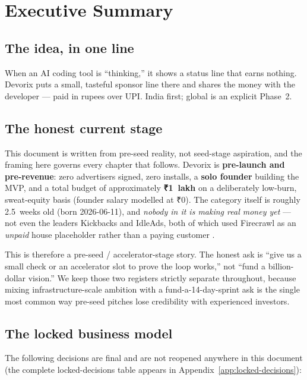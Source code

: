 \chapter{Executive Summary}
\label{ch:executive-summary}

\section{The idea, in one line}

When an AI coding tool is ``thinking,'' it shows a status line that earns
nothing. Devorix puts a small, tasteful sponsor line there and shares the money
with the developer --- paid in rupees over UPI. India first; global is an
explicit Phase~2.

\section{The honest current stage}

This document is written from pre-seed reality, not seed-stage aspiration, and
the framing here governs every chapter that follows. Devorix is
\textbf{pre-launch and pre-revenue}: zero advertisers signed, zero installs, a
\textbf{solo founder} building the MVP, and a total budget of approximately
\textbf{₹1~lakh} on a deliberately low-burn, sweat-equity basis (founder
salary modelled at ₹0). The category itself is roughly 2.5~weeks old (born
2026-06-11), and \emph{nobody in it is making real money yet} --- not even the
leaders Kickbacks and IdleAds, both of which used Firecrawl as an
\emph{unpaid} house placeholder rather than a paying customer
\citep{masterplan_2026}.

This is therefore a pre-seed / accelerator-stage story. The honest ask is
``give us a small check or an accelerator slot to prove the loop works,'' not
``fund a billion-dollar vision.'' We keep those two registers strictly
separate throughout, because mixing infrastructure-scale ambition with a
fund-a-14-day-sprint ask is the single most common way pre-seed pitches lose
credibility with experienced investors.

\section{The locked business model}

The following decisions are final and are not reopened anywhere in this
document (the complete locked-decisions table appears in
Appendix~\ref{app:locked-decisions}):

